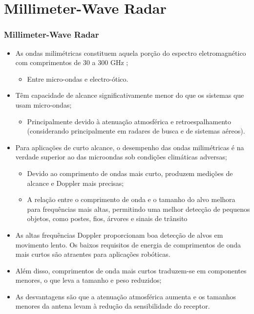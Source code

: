 \documentclass[xcolor=dvipsnames, aspectratio=169]{beamer}
\begin{document}
\section[Millimeter-Wave Radar]{Millimeter-Wave Radar} 
\begin{frame}
\frametitle{Millimeter-Wave Radar}
	\begin{itemize}
		\item As ondas milimétricas constituem aquela porção do espectro eletromagnético com comprimentos de 30 a 300 GHz \cite{everett1995sensors};
		\begin{itemize}
            \item Entre micro-ondas e electro-ótico.
        \end{itemize} 
		\item Têm capacidade de alcance significativamente menor do que os sistemas que usam micro-ondas;
		\begin{itemize}
            \item Principalmente devido à atenuação atmosférica e retroespalhamento (considerando principalmente em radares de busca e de sistemas aéreos).
        \end{itemize}
		\item Para aplicações de curto alcance, o desempenho das ondas milimétricas é na verdade superior ao das microondas sob condições climáticas adversas;
		\begin{itemize}
            \item Devido ao comprimento de ondas mais curto, produzem medições de alcance e Doppler mais precisas;
            \item A relação entre o comprimento de onda e o tamanho do alvo melhora para frequências mais
            altas, permitindo uma melhor detecção de pequenos objetos, como postes, fios, árvores e sinais
            de trânsito
        \end{itemize}
        \item As altas frequências Doppler proporcionam boa detecção de alvos em movimento lento. Os baixos requisitos de energia
        de comprimentos de onda mais curtos são atraentes para aplicações robóticas. 
        \item Além disso, comprimentos de onda mais curtos traduzem-se em componentes menores, o que leva a tamanho e
        peso reduzidos; 
        \item As desvantagens são que a atenuação atmosférica aumenta e os tamanhos
        menores da antena levam à redução da sensibilidade do receptor.
	\end{itemize}
\end{frame}
\end{document}
